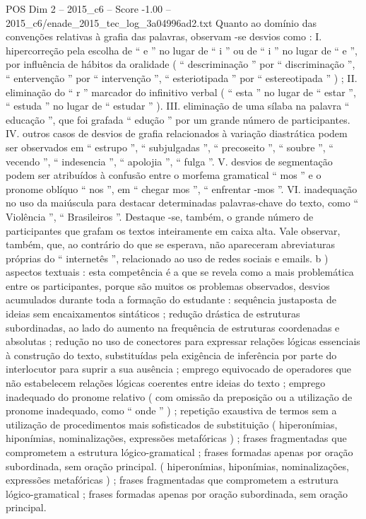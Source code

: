 \begin{textsample}{POS Dim 2 – 2015\_c6 – Score -1.00 – 2015\_c6/enade\_2015\_tec\_log\_3a04996ad2.txt}
Quanto ao domínio das convenções relativas à grafia das palavras, observam -se desvios como : I. hipercorreção pela escolha de “ e ” no lugar de “ i ” ou de “ i ” no lugar de “ e ”, por influência de hábitos da oralidade ( “ descriminação ” por “ discriminação ”, “ entervenção ” por “ intervenção ”, “ esteriotipada ” por “ estereotipada ” ) ; II. eliminação do “ r ” marcador do infinitivo verbal ( “ esta ” no lugar de “ estar ”, “ estuda ” no lugar de “ estudar ” ).
III. eliminação de uma sílaba na palavra “ educação ”, que foi grafada “ edução ” por um grande número de participantes.
IV. outros casos de desvios de grafia relacionados à variação diastrática podem ser observados em “ estrupo ”, “ subjulgadas ”, “ precoseito ”, “ soubre ”, “ vecendo ”, “ indesencia ”, “ apolojia ”, “ fulga ”.
V. desvios de segmentação podem ser atribuídos à confusão entre o morfema gramatical “ mos ” e o pronome oblíquo “ nos ”, em “ chegar mos ”, “ enfrentar -mos ”.
VI. inadequação no uso da maiúscula para destacar determinadas palavras-chave do texto, como “ Violência ”, “ Brasileiros ”.
Destaque -se, também, o grande número de participantes que grafam os textos inteiramente em caixa alta.
Vale observar, também, que, ao contrário do que se esperava, não apareceram abreviaturas próprias do “ internetês ”, relacionado ao uso de redes sociais e emails. b ) aspectos textuais : esta competência é a que se revela como a mais problemática entre os participantes, porque são muitos os problemas observados, desvios acumulados durante toda a formação do estudante : sequência justaposta de ideias sem encaixamentos sintáticos ; redução drástica de estruturas subordinadas, ao lado do aumento na frequência de estruturas coordenadas e absolutas ; redução no uso de conectores para expressar relações lógicas essenciais à construção do texto, substituídas pela exigência de inferência por parte do interlocutor para suprir a sua ausência ; emprego equivocado de operadores que não estabelecem relações lógicas coerentes entre ideias do texto ; emprego inadequado do pronome relativo ( com omissão da preposição ou a utilização de pronome inadequado, como “ onde ” ) ; repetição exaustiva de termos sem a utilização de procedimentos mais sofisticados de substituição ( hiperonímias, hiponímias, nominalizações, expressões metafóricas ) ; frases fragmentadas que comprometem a estrutura lógico-gramatical ; frases formadas apenas por oração subordinada, sem oração principal. ( hiperonímias, hiponímias, nominalizações, expressões metafóricas ) ; frases fragmentadas que comprometem a estrutura lógico-gramatical ; frases formadas apenas por oração subordinada, sem oração principal.

\end{textsample}
